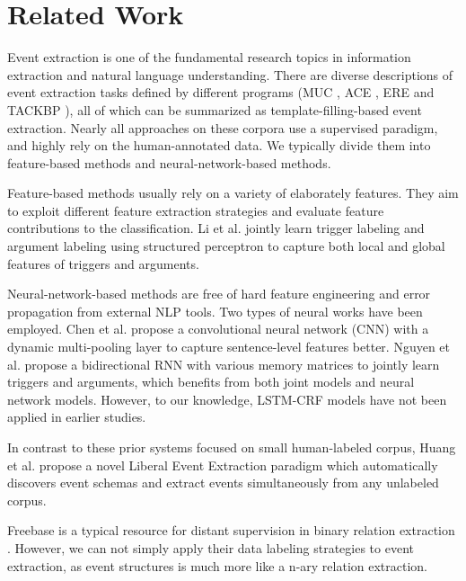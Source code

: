 \section{Related Work}
Event extraction is one of the fundamental research topics in information extraction and natural language understanding. There are diverse descriptions of event extraction tasks defined by different programs (MUC \cite{grishman1996message}, ACE \cite{doddington2004automatic}, ERE \cite{song2015light} and TACKBP \cite{mitamura2015event}), all of which can be summarized as template-filling-based event extraction. Nearly all approaches on these corpora use a supervised paradigm, and highly rely on the human-annotated data. We typically divide them into feature-based methods and neural-network-based methods. 

Feature-based methods usually rely on a variety of elaborately features. They aim to exploit different feature extraction strategies and evaluate feature contributions to the classification. Li et al.  jointly learn trigger labeling and argument labeling using structured perceptron to capture both local and global features of triggers and arguments. 

Neural-network-based methods are free of hard feature engineering and error propagation from external NLP tools. Two types of neural works have been employed. Chen et al.  propose a convolutional neural network (CNN) with a dynamic multi-pooling layer to capture sentence-level features better. Nguyen et al.  propose a bidirectional RNN with various memory matrices to jointly learn triggers and arguments, which benefits from both joint models and neural network models. However, to our knowledge, LSTM-CRF models have not been applied in earlier studies.

In contrast to these prior systems focused on small human-labeled corpus, Huang et al.  propose a novel Liberal Event Extraction paradigm which automatically discovers event schemas and extract events simultaneously from any unlabeled corpus. 

Freebase is a typical resource for distant supervision in binary relation extraction \cite{mintz2009distant,zeng2015distant}. However, we can not simply apply their data labeling strategies to event extraction, as event structures is much more like a n-ary relation extraction.
